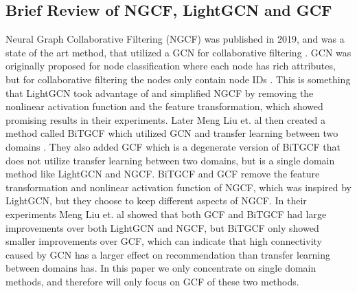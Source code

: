\subsection{Brief Review of NGCF, LightGCN and GCF}\label{subsubsec:brief-review}
Neural Graph Collaborative Filtering (NGCF) was published in 2019, and was a state of the art method, that utilized a GCN for collaborative filtering \cite{NGCF_2019}.
GCN was originally proposed for node classification where each node has rich attributes, but for collaborative filtering the nodes only contain node IDs \cite{lightgcn,kipf2017semisupervised,NGCF_2019}.
This is something that LightGCN took advantage of and simplified NGCF by removing the nonlinear activation function and the feature transformation, which showed promising results in their experiments.
Later Meng Liu et. al then created a method called BiTGCF which utilized GCN and transfer learning between two domains \cite{BiTGCF}.
They also added GCF which is a degenerate version of BiTGCF that does not utilize transfer learning between two domains, but is a single domain method like LightGCN and NGCF.
BiTGCF and GCF remove the feature transformation and nonlinear activation function of NGCF, which was inspired by LightGCN, but they choose to keep different aspects of NGCF.
In their experiments Meng Liu et. al showed that both GCF and BiTGCF had large improvements over both LightGCN and NGCF, but BiTGCF only showed smaller improvements over GCF, which can indicate that high connectivity caused by GCN has a larger effect on recommendation than transfer learning between domains has.
In this paper we only concentrate on single domain methods, and therefore will only focus on GCF of these two methods.

